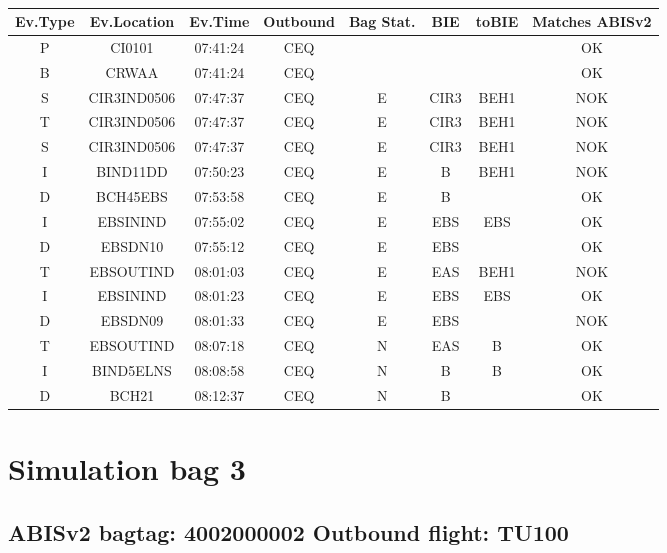 \documentclass{report}
\begin{document}
\paragraph{}
\begin{longtable}{cccccccc}    \toprule
\rowcolor{white!50}
\textbf{Ev.Type} & \textbf{Ev.Location} & \textbf{Ev.Time} & \textbf{Outbound} & \textbf{Bag Stat.} & \textbf{BIE} & \textbf{toBIE} & \textbf{Matches ABISv2} \\\midrule
P & CI0101 & 07:41:24  & CEQ &  &  &  & OK\\
B & CRWAA & 07:41:24  & CEQ &  &  &  & OK\\
S & CIR3IND0506 & 07:47:37  & CEQ & E & CIR3 & BEH1 & NOK\\
T & CIR3IND0506 & 07:47:37  & CEQ & E & CIR3 & BEH1 & NOK\\
S & CIR3IND0506 & 07:47:37  & CEQ & E & CIR3 & BEH1 & NOK\\
I & BIND11DD & 07:50:23  & CEQ & E & B & BEH1 & NOK\\
D & BCH45EBS & 07:53:58  & CEQ & E & B &  & OK\\
I & EBSININD & 07:55:02  & CEQ & E & EBS & EBS & OK\\
D & EBSDN10 & 07:55:12  & CEQ & E & EBS &  & OK\\
T & EBSOUTIND & 08:01:03  & CEQ & E & EAS & BEH1 & NOK\\
I & EBSININD & 08:01:23  & CEQ & E & EBS & EBS & OK\\
D & EBSDN09 & 08:01:33  & CEQ & E & EBS &  & NOK\\
T & EBSOUTIND & 08:07:18  & CEQ & N & EAS & B & OK\\
I & BIND5ELNS & 08:08:58  & CEQ & N & B & B & OK\\
D & BCH21 & 08:12:37  & CEQ & N & B &  & OK\\
\bottomrule
\end{longtable}
\pagebreak
\section*{Simulation bag 3}
\subsection*{ABISv2 bagtag: 4002000002 Outbound flight: TU100}
\end{document}
